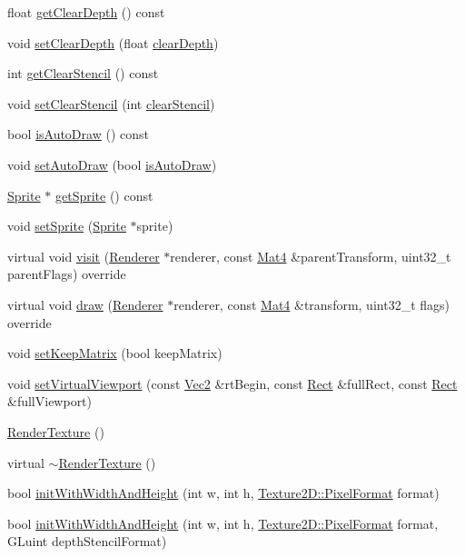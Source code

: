 \begin{DoxyCompactItemize}
float \hyperlink{classRenderTexture_ade767eafbb1c6214ffe3150591ed8c90}{get\+Clear\+Depth} () const
\item 
void \hyperlink{classRenderTexture_a7e72dc0bbbbfd010ae3e568bd5675a6f}{set\+Clear\+Depth} (float \hyperlink{classRenderTexture_a86d653a1a716ebe46631010e6b220568}{clear\+Depth})
\item 
int \hyperlink{classRenderTexture_a24a04ac4d778a70099d425c11df6cd02}{get\+Clear\+Stencil} () const
\item 
void \hyperlink{classRenderTexture_a56dca402afad6762c5fe3c91dae32d8b}{set\+Clear\+Stencil} (int \hyperlink{classRenderTexture_a8c6beead393100c29a32f745f9bafd76}{clear\+Stencil})
\item 
bool \hyperlink{classRenderTexture_a538e18e303e88d097d3cab36fe40cf86}{is\+Auto\+Draw} () const
\item 
void \hyperlink{classRenderTexture_af41afca2870fc8b26f4fec8d6ff89a3e}{set\+Auto\+Draw} (bool \hyperlink{classRenderTexture_a538e18e303e88d097d3cab36fe40cf86}{is\+Auto\+Draw})
\item 
\hyperlink{classSprite}{Sprite} $\ast$ \hyperlink{classRenderTexture_a89c3bcda8dbca417127adbce86cc3bb6}{get\+Sprite} () const
\item 
void \hyperlink{classRenderTexture_a68570f2b0fe7e04eb842a3ab11ffd7f7}{set\+Sprite} (\hyperlink{classSprite}{Sprite} $\ast$sprite)
\item 
virtual void \hyperlink{classRenderTexture_a92007b10e5dab891532bd0daa1a24be8}{visit} (\hyperlink{classRenderer}{Renderer} $\ast$renderer, const \hyperlink{classMat4}{Mat4} \&parent\+Transform, uint32\+\_\+t parent\+Flags) override
\item 
virtual void \hyperlink{classRenderTexture_a845d9983454acb72fb8666f92146b082}{draw} (\hyperlink{classRenderer}{Renderer} $\ast$renderer, const \hyperlink{classMat4}{Mat4} \&transform, uint32\+\_\+t flags) override
\item 
void \hyperlink{classRenderTexture_a9cfc0e640f5e3ddf666bd3b7b735991a}{set\+Keep\+Matrix} (bool keep\+Matrix)
\item 
void \hyperlink{classRenderTexture_a0b508deeb3efa8522314973a54e97815}{set\+Virtual\+Viewport} (const \hyperlink{classVec2}{Vec2} \&rt\+Begin, const \hyperlink{classRect}{Rect} \&full\+Rect, const \hyperlink{classRect}{Rect} \&full\+Viewport)
\item 
\hyperlink{classRenderTexture_a1882e3cf661e622e5e494c1d7ec9e798}{Render\+Texture} ()
\item 
virtual \hyperlink{classRenderTexture_a428b5e7e40f5bd8b121d71eef60a881a}{$\sim$\+Render\+Texture} ()
\item 
bool \hyperlink{classRenderTexture_a77d3e22af2c64225b1852653fc4c5452}{init\+With\+Width\+And\+Height} (int w, int h, \hyperlink{classTexture2D_a45d9d8bb5a0669def36bbdfbfb91d220}{Texture2\+D\+::\+Pixel\+Format} format)
\item 
bool \hyperlink{classRenderTexture_a1bceb3ba56e1b6353fa9f9e032ed0fc7}{init\+With\+Width\+And\+Height} (int w, int h, \hyperlink{classTexture2D_a45d9d8bb5a0669def36bbdfbfb91d220}{Texture2\+D\+::\+Pixel\+Format} format, G\+Luint depth\+Stencil\+Format)
\end{DoxyCompactItemize}
